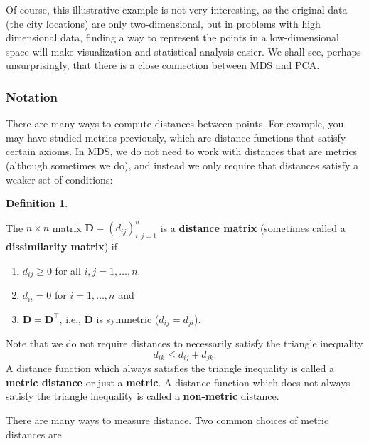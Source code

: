 \documentclass[
]{book}
\providecommand{\tightlist}{%
  \setlength{\itemsep}{0pt}\setlength{\parskip}{0pt}}
\theoremstyle{definition}
\newtheorem{definition}{Definition}[chapter]
\theoremstyle{definition}
\theoremstyle{definition}
\theoremstyle{definition}
\theoremstyle{remark}
\begin{document}
Of course, this illustrative example is not very interesting, as the original data (the city locations) are only two-dimensional, but in problems with high dimensional data, finding a way to
represent the points in a low-dimensional space will make visualization and statistical analysis easier. We shall see, perhaps unsurprisingly, that there is a close connection between MDS and PCA.

\subsubsection*{Notation}\label{notation-2}

There are many ways to compute distances between points. For example, you may have studied metrics previously, which are distance functions that satisfy certain axioms. In MDS, we do not need to work with distances that are metrics (although sometimes we do), and instead we only require that distances satisfy a weaker set of conditions:

\begin{definition}
\protect\hypertarget{def:distanceD}{}\label{def:distanceD}

The \(n \times n\) matrix \(\mathbf D=(d_{ij})_{i,j=1}^n\) is a \textbf{distance matrix} (sometimes called a \textbf{dissimilarity matrix}) if

\begin{enumerate}
\def\labelenumi{\arabic{enumi}.}
\tightlist
\item
  \(d_{ij}\geq 0\) for all \(i, j=1,\ldots,n\).
\item
  \(d_{ii}=0\) for \(i=1,\ldots, n\) and
\item
  \(\mathbf D=\mathbf D^\top\), i.e., \(\mathbf D\) is symmetric (\(d_{ij}=d_{ji}\)).
\end{enumerate}

\end{definition}

Note that we do not require distances to necessarily satisfy the triangle inequality
\begin{equation}
d_{ik} \leq d_{ij}+d_{jk}.
\label{eq:triangle}
\end{equation}
A distance function which always satisfies the triangle inequality is called a \textbf{metric distance}
or just a \textbf{metric}. A distance function which does not always satisfy the triangle inequality is called a
\textbf{non-metric} distance.

There are many ways to measure distance. Two common choices of metric distances are
\end{document}
